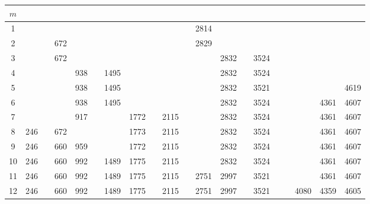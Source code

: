 \begin{landscape}
        \begin{table}
            \centering
            \begin{tabular}{|c|ccccccccccccccccccc|}\hline
                $m$  &      &     &     &     &      &      &      &      &      &      &      &      &      &      &      &      &      &      &      \\\hline
                1  &      &     &     &     &      &      &      &      &      &      & 2814 &      &      &      &      &      &      &      &     \\
                2  &      &     & 672 &     &      &      &      &      &      &      & 2829 &      &      &      &      &      &      &      &     \\
                3  &      &     & 672 &     &      &      &      &      &      &      &      & 2832 &      & 3524 &      &      &      &      &     \\
                4  &      &     &     & 938 &      & 1495 &      &      &      &      &      & 2832 &      & 3524 &      &      &      &      &     \\
                5  &      &     &     & 938 &      & 1495 &      &      &      &      &      & 2832 &      & 3521 &      &      &      &      & 4619\\
                6  &      &     &     & 938 &      & 1495 &      &      &      &      &      & 2832 &      & 3524 &      &      &      & 4361 & 4607\\
                7  &      &     &     & 917 &      &      & 1772 &      & 2115 &      &      & 2832 &      & 3524 &      &      &      & 4361 & 4607\\
                8  &  246 &     & 672 &     &      &      & 1773 &      & 2115 &      &      & 2832 &      & 3524 &      &      &      & 4361 & 4607\\
                9  &  246 &     & 660 & 959 &      &      & 1772 &      & 2115 &      &      & 2832 &      & 3524 &      &      &      & 4361 & 4607\\
                10 &  246 &     & 660 & 992 &      & 1489 & 1775 &      & 2115 &      &      & 2832 &      & 3524 &      &      &      & 4361 & 4607\\
                11 &  246 &     & 660 & 992 &      & 1489 & 1775 &      & 2115 &      & 2751 & 2997 &      & 3521 &      &      &      & 4361 & 4607\\
                12 &  246 &     & 660 & 992 &      & 1489 & 1775 &      & 2115 &      & 2751 & 2997 &      & 3521 &      &      & 4080 & 4359 & 4605\\

\end{tabular}
\end{table}
\end{landscape}
